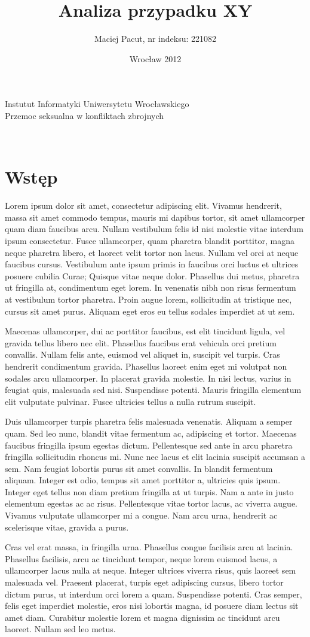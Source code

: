 \documentclass{article}
\title{Analiza przypadku XY}
\author{Maciej Pacut, nr indeksu: 221082}
\date{Wrocław 2012}
\makeatletter
\renewcommand{\maketitle}{\begin{titlepage}
    \vspace*{1cm}
    \begin{center}
      Instutut Informatyki Uniwersytetu Wrocławskiego\\
      Przemoc seksualna w konfliktach zbrojnych \\
      \vspace{3cm}
      \normalsize \@author \par
      \vspace{0.8cm}
      \noindent
      \LARGE \textsc{\@title}\\
      \vspace{1cm}
      \normalsize
    \end{center}
    \vspace{0.5cm}
    \begin{flushright}
      \vspace{5cm}
    \end{flushright}
    \vspace*{\stretch{6}}
    \begin{center}
      \@date
    \end{center}
  \end{titlepage}%
}
\makeatother
\begin{document}
\maketitle
\newpage

\section{Wstęp}

Lorem ipsum dolor sit amet, consectetur adipiscing elit. Vivamus
hendrerit, massa sit amet commodo tempus, mauris mi dapibus tortor,
sit amet ullamcorper quam diam faucibus arcu. Nullam vestibulum felis
id nisi molestie vitae interdum ipsum consectetur. Fusce ullamcorper,
quam pharetra blandit porttitor, magna neque pharetra libero, et
laoreet velit tortor non lacus. Nullam vel orci at neque faucibus
cursus. Vestibulum ante ipsum primis in faucibus orci luctus et
ultrices posuere cubilia Curae; Quisque vitae neque dolor. Phasellus
dui metus, pharetra ut fringilla at, condimentum eget lorem. In
venenatis nibh non risus fermentum at vestibulum tortor pharetra.
Proin augue lorem, sollicitudin at tristique nec, cursus sit amet
purus. Aliquam eget eros eu tellus sodales imperdiet at ut sem. 


 Maecenas ullamcorper, dui ac porttitor faucibus, est elit tincidunt
 ligula, vel gravida tellus libero nec elit. Phasellus faucibus erat
 vehicula orci pretium convallis. Nullam felis ante, euismod vel
 aliquet in, suscipit vel turpis. Cras hendrerit condimentum gravida.
 Phasellus laoreet enim eget mi volutpat non sodales arcu ullamcorper.
 In placerat gravida molestie. In nisi lectus, varius in feugiat quis,
 malesuada sed nisi. Suspendisse potenti. Mauris fringilla elementum
 elit vulputate pulvinar. Fusce ultricies tellus a nulla rutrum
 suscipit. 


 Duis ullamcorper turpis pharetra felis malesuada venenatis. Aliquam a
 semper quam. Sed leo nunc, blandit vitae fermentum ac, adipiscing et
 tortor. Maecenas faucibus fringilla ipsum egestas dictum.
 Pellentesque sed ante in arcu pharetra fringilla sollicitudin rhoncus
 mi. Nunc nec lacus et elit lacinia suscipit accumsan a sem. Nam
 feugiat lobortis purus sit amet convallis. In blandit fermentum
 aliquam. Integer est odio, tempus sit amet porttitor a, ultricies
 quis ipsum. Integer eget tellus non diam pretium fringilla at ut
 turpis. Nam a ante in justo elementum egestas ac ac risus.
 Pellentesque vitae tortor lacus, ac viverra augue. Vivamus vulputate
 ullamcorper mi a congue. Nam arcu urna, hendrerit ac scelerisque
 vitae, gravida a purus.
 

 Cras vel erat massa, in fringilla urna. Phasellus congue facilisis
 arcu at lacinia. Phasellus facilisis, arcu ac tincidunt tempor, neque
 lorem euismod lacus, a ullamcorper lacus nulla at neque. Integer
 ultrices viverra risus, quis laoreet sem malesuada vel. Praesent
 placerat, turpis eget adipiscing cursus, libero tortor dictum purus,
 ut interdum orci lorem a quam. Suspendisse potenti. Cras semper,
 felis eget imperdiet molestie, eros nisi lobortis magna, id posuere
 diam lectus sit amet diam. Curabitur molestie lorem et magna
 dignissim ac tincidunt arcu laoreet. Nullam sed leo metus.
\end{document}
